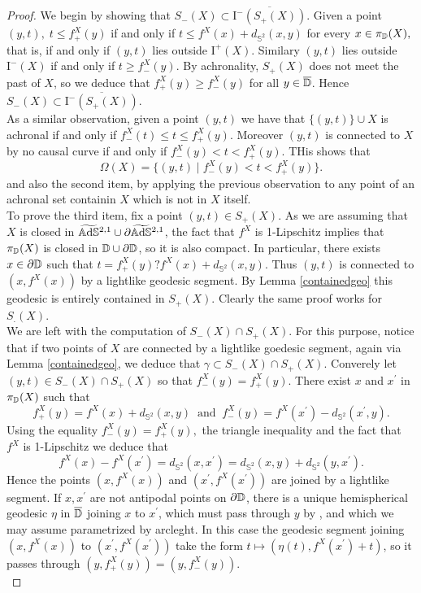 \begin{proof}
    We begin by showing that $S_-(X)\subset \overline{\text{I}^-(S_+(X))}$. Given a point $(y,t),\;t\leq f_+^X(y)$ if and only if $t\leq f^X(x)+d_{\mathbb{S}^2}(x,y)$ for every $x\in\pi_{\mathbb{D}}(X),$ that is, if and only if $(y,t)$ lies outside $\text{I}^+(X)$. Similary $(y,t)$ lies outside $\text{I}^-(X)$ if and only if $t\geq f_-^X(y).$ By achronality, $S_+(X)$ does not meet the past of $X$, so we deduce that $f_+^X(y)\geq f_-^X(y)$ for all $y\in\overline{\mathbb{D}}$. Hence $S_-(X)\subset \overline{\text{I}^-(S_+(X))}$.\\
    As a similar observation, given a point $(y,t)$ we have that $\{(y,t)\}\cup X$ is achronal if and only if $f_-^X(t)\leq t\leq f_+^X(y)$. Moreover $(y,t)$ is connected to $X$ by no causal curve if and only if $f_-^X(y)<t<f_+^X(y)$. THis shows that 
    \[
        \Omega(X)=\{(y,t)\;|\;f_-^X(y)<t<f_+^X(y)\}.
    \]
    and also the second item, by applying the previous observation to any point of an achronal set containin $X$ which is not in $X$ itself. \\
    To prove the third item, fix a point $(y,t)\in S_+(X)$. As we are assuming that $X$ is closed in $\widetilde{\mathbb{A}\mathrm{d}\mathbb{S}}{}^{2,1}\cup\partial\widetilde{\mathbb{A}\mathrm{d}\mathbb{S}}{}^{2,1}$, the fact that $f^X$ is 1-Lipschitz implies that $\pi_{\mathbb{D}}(X)$ is closed in $\mathbb{D}\cup\partial\mathbb{D}$, so it is also compact. In particular, there exists $x\in\partial\mathbb{D}$ such that $t=f_+^X(y)?f^X(x)+d_{\mathbb{S}^2}(x,y)$. Thus $(y,t)$ is connected to $(x,f^X(x))$ by a lightlike geodesic segment. By Lemma \ref{containedgeo} this geodesic is entirely contained in $S_+(X)$. Clearly the same proof works for $S_.(X)$. \\
    We are left with the computation of $S_-(X)\cap S_+(X)$. For this purpose, notice that if two points of $X$ are connected by a lightlike goedesic segment, again via Lemma \ref{containedgeo}, we deduce that $\gamma\subset S_-(X)\cap S_+(X).$ Converely let $(y,t)\in S_-(X)\cap S_+(X)$ so that $f_-^X(y)=f_+^X(y).$ There exist $x$ and $x^{\prime}$ in $\pi_{\mathbb{D}}(X)$ such that 
    \[
        f_+^X(y)=f^{X}(x)+d_{\mathbb{S}^2}(x,y) \;\;\text{and}\;\;f_-^X(y)=f^X(x^{\prime})-d_{\mathbb{S}^2}(x^{\prime},y). 
    \]
    Using the equality $f_-^X(y)=f_+^X(y),$ the triangle inequality and the fact that $f^X$ is 1-Lipschitz we deduce that 
    \begin{equation}\label{42}
        f^{X}(x)-f^X(x^{\prime})=d_{\mathbb{S}^2}(x,x^{\prime})=d_{\mathbb{S}^2}(x,y)+d_{\mathbb{S}^2}(y,x^{\prime}). 
       \end{equation}
       Hence the points $(x,f^X(x))$ and $(x^{\prime},f^X(x^{\prime} ))$ are joined by a lightlike segment. If $x,x^{\prime}$ are not antipodal points on $\partial\mathbb{D}$, there is a unique hemispherical geodesic $\eta$ in $\overline{\mathbb{D}}$ joining $x$ to $x^{\prime}$, which must pass through $y$ by , and which we may assume parametrized by arcleght. In this case the geodesic segment joining $(x,f^X(x))$ to $(x^{\prime},f^X(x^{\prime} ))$ take the form $t\mapsto(\eta(t),f^X(x^{\prime})+t)$, so it passes through $(y,f_+^X(y))=(y,f_-^X(y)).$\\

\end{proof}

